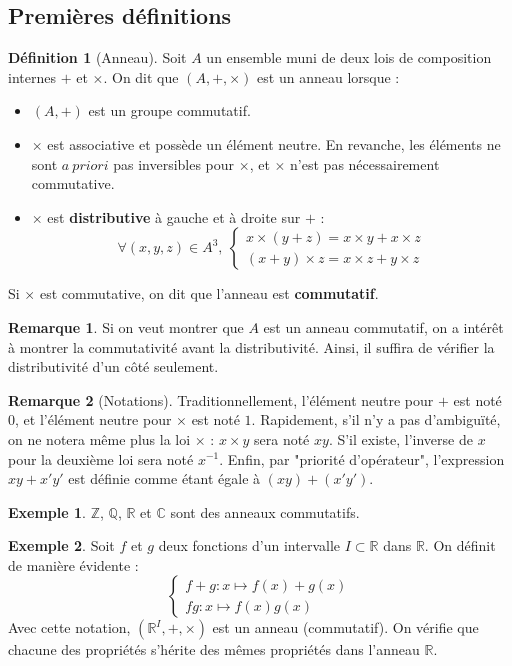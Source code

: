 \documentclass[french]{book}
\newcommand{\Z}{\mathbb{Z}}
\newcommand{\Q}{\mathbb{Q}}
\newcommand{\R}{\mathbb{R}}
\newcommand{\C}{\mathbb{C}}
\newcommand{\inv}{^{-1}}
\theoremstyle{plain}
\theoremstyle{definition}
\newtheorem{dfn}{Définition}[chapter]
\newtheorem{exa}{Exemple}[chapter]
\newtheorem{rmq}{Remarque}[chapter]
\theoremstyle{remark}
\begin{document}
\subsection{Premières définitions}
\begin{dfn}[Anneau]
	Soit $A$ un ensemble muni de deux lois de composition internes $+$ et $\times$. On dit que $(A,+,\times)$ est un anneau lorsque :
	\begin{itemize}
		\item $(A,+)$ est un groupe commutatif.
		\item $\times$ est associative et possède un élément neutre. En revanche, les éléments ne sont $a \ priori$ pas inversibles pour $\times$, et $\times$ n'est pas nécessairement commutative.
		\item $\times$ est \textbf{distributive} à gauche et à droite sur $+$ :
		$$\forall (x,y,z)\in A^3,\ \left \{\begin{array}{ll}x\times(y+z)=x\times y+x\times z \\ (x+y)\times z=x\times z +y\times z\end{array}\right.$$
	\end{itemize}
	Si $\times$ est commutative, on dit que l'anneau est \textbf{commutatif}.
\end{dfn}
\begin{rmq}
	Si on veut montrer que $A$ est un anneau commutatif, on a intérêt à montrer la commutativité avant la distributivité. Ainsi, il suffira de vérifier la distributivité d'un côté seulement.
\end{rmq}
\begin{rmq}[Notations]
	Traditionnellement, l'élément neutre pour $+$ est noté $0$, et l'élément neutre pour $\times$ est noté $1$. Rapidement, s'il n'y a pas d'ambiguïté, on ne notera même plus la loi $\times$ : $x\times y$ sera noté $xy$. S'il existe, l'inverse de $x$ pour la deuxième loi sera noté $x\inv$. Enfin, par "priorité d'opérateur", l'expression $xy+x'y'$ est définie comme étant égale à $(xy)+(x'y')$.
\end{rmq}
\begin{exa}
	$\Z$, $\Q$, $\R$ et $\C$ sont des anneaux commutatifs.
\end{exa}
\begin{exa}
	Soit $f$ et $g$ deux fonctions d'un intervalle $I\subset\R$ dans $\R$. On définit de manière évidente : $$\left \{\begin{array}{ll}f+g:x\mapsto f(x)+g(x)\\fg:x\mapsto f(x)g(x)\end{array}\right.$$ Avec cette notation, $(\R^I,+,\times)$ est un anneau (commutatif). On vérifie que chacune des propriétés s'hérite des mêmes propriétés dans l'anneau $\R$.
\end{exa}
\end{document}
